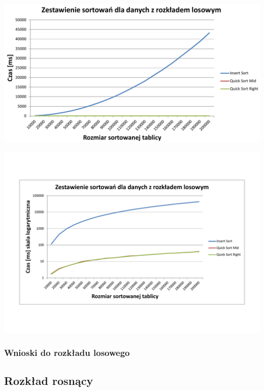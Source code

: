 \documentclass[polish,polish,a4paper]{article}
\begin{document}
\begin{spacing}{1.5}
\begin{minipage}[H]{\textwidth}
	\begin{center}
		\includegraphics[scale=0.6]{zad3losowynorm.pdf}
		\label{fig:zad3losn}
	\end{center}
\end{minipage}

\begin{minipage}[H]{\textwidth}
	\begin{center}
		\includegraphics[scale=0.55]{zad3losowylog.pdf}
		\label{fig:zad3loslog}
	\end{center}
\end{minipage}

\subsubsection{Wnioski do rozkładu losowego}

\subsection{Rozkład rosnący}


\end{spacing}
\end{document}
